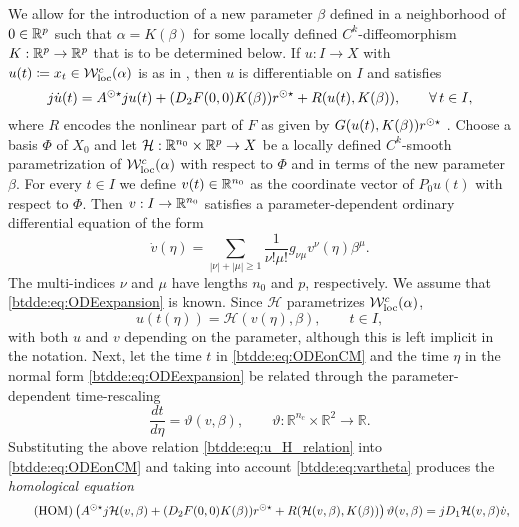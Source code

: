 We allow for the introduction of a new parameter $\beta$ defined in a
neighborhood of $0 \in \mathbb{R}^p$ such that $\alpha = K(\beta)$ for some locally
defined $C^k$-diffeomorphism $K : \mathbb{R}^p \to \mathbb{R}^p$ that is to be determined
below. If $u : I \to X$ with $u(t) \coloneqq x_t \in \mathcal{W}^c_{\text{loc}}(\alpha)$ is as in
\cite[Corollary 20]{Switching2019}, then $u$ is differentiable on $I$ and
satisfies
\begin{equation}
  \label{btdde:eq:ODEonCM}
  j\dot{u}(t) = A^{\odot\star}ju(t) + (D_2F(0,0)K(\beta))r^{\odot\star} 
    + R(u(t),K(\beta)), \qquad \forall\,t \in I,
\end{equation}
where $R$ encodes the nonlinear part of $F$ as given by $G(u(t),K(\beta))r^{\odot\star}$
. Choose a basis $\Phi$ of $X_0$ and let $\mathcal{H} : \mathbb{R}^{n_0} \times \mathbb{R}^p
\to X$ be a locally defined $C^k$-smooth parametrization of $\mathcal{W}^c_{\text{loc}}(\alpha)$ with
respect to $\Phi$ and in terms of the new parameter $\beta$. For every $t \in
I$ we define $v(t) \in \mathbb{R}^{n_0}$ as the coordinate vector of $P_0 u(t)$ with
respect to $\Phi$. Then $v : I \to \mathbb{R}^{n_0}$ satisfies a parameter-dependent
ordinary differential equation of the form
\begin{equation}
  \label{btdde:eq:ODEexpansion}
  \dot{v}(\eta) = \sum_{|\nu| + |\mu| \geq 1}\frac{1}{\nu!\mu!}g_{\nu\mu}v^{\nu}(\eta)\beta^{\mu}.
\end{equation}
The multi-indices $\nu$ and $\mu$ have lengths $n_0$ and $p$, respectively. We
assume that \cref{btdde:eq:ODEexpansion} is known. Since $\mathcal{H}$ parametrizes
$\mathcal{W}^c_{\text{loc}}(\alpha)$,
\begin{equation}
    \label{btdde:eq:u_H_relation}
    u(t(\eta)) = \mathcal{H}(v(\eta), \beta), \qquad t \in I,
\end{equation}
with both $u$ and $v$ depending on the parameter, although this is left
implicit in the notation. Next, let the time $t$ in \cref{btdde:eq:ODEonCM} and the
time $\eta$ in the normal form \cref{btdde:eq:ODEexpansion} be related through the
parameter-dependent time-rescaling
\begin{equation}
\label{btdde:eq:vartheta}
    \frac{dt}{d\eta} = \vartheta(v, \beta), \qquad 
        \vartheta\colon \mathbb R^{n_c} \times \mathbb R^2 \to \mathbb R.
\end{equation}
Substituting the above relation \cref{btdde:eq:u_H_relation} into \cref{btdde:eq:ODEonCM}
and taking into account \cref{btdde:eq:vartheta} produces the \emph{homological equation}
\begin{equation}
  \label{btdde:eq:homological_equation}
  \tag{HOM}
  \left ( A^{\odot\star}j\mathcal{H}(v,\beta) + (D_2F(0,0)K(\beta))r^{\odot\star} 
          + R(\mathcal{H}(v,\beta),K(\beta)) \right) \vartheta(v,\beta)
   = jD_1\mathcal{H}(v,\beta)\dot{v},
\end{equation}
